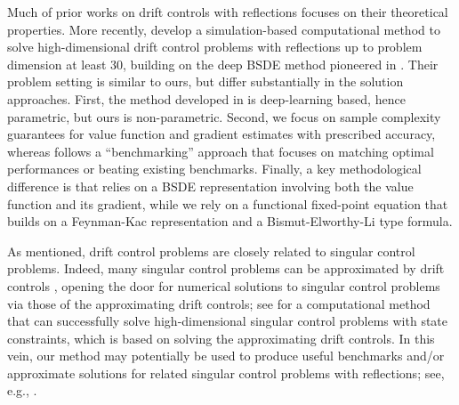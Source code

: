 \documentclass[11pt]{article}
\theoremstyle{definition}
\theoremstyle{plain}
\begin{document}
Much of prior works on drift controls with reflections focuses on their theoretical properties. 
More recently, \cite{AtaHarrisonSi2024} develop a simulation-based computational method 
to solve high-dimensional drift control problems with reflections up to problem dimension at least $30$, building on the deep BSDE method 
pioneered in \cite{HanJentzenE2018PNAS}. Their problem setting is similar to ours, but differ substantially in the solution approaches. 
First, the method developed in \cite{AtaHarrisonSi2024} is deep-learning based, hence parametric, 
but ours is non-parametric. Second, we focus on sample complexity guarantees for value function and gradient estimates with prescribed accuracy, 
whereas \cite{AtaHarrisonSi2024} follows a ``benchmarking'' approach that focuses on matching optimal performances or beating existing benchmarks. 
Finally, a key methodological difference is that \cite{AtaHarrisonSi2024} relies on a BSDE representation involving both the value function and its gradient, 
while we rely on a functional fixed-point equation that builds on a Feynman-Kac representation and a Bismut-Elworthy-Li type formula. 

As mentioned, drift control problems are closely related to singular control problems. Indeed, many singular control problems can be approximated 
by drift controls \cite{DaiZhong2010,menaldi1989optimal,williams1994regularity}, opening the door for numerical solutions to singular control problems 
via those of the approximating drift controls; see \cite{ata2024singular} for a computational method that can successfully solve high-dimensional singular control problems 
with state constraints, which is based on solving the approximating drift controls. 
In this vein, our method may potentially be used to produce useful benchmarks and/or approximate solutions for related singular control problems with reflections; see, e.g., \cite{atar2006singular,PesicWilliams2016}.
\end{document}

